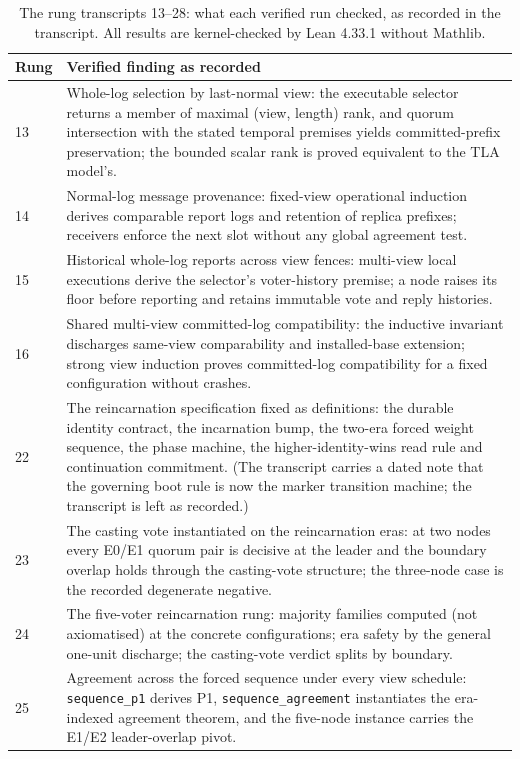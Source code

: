 \documentclass[10pt,journal,letterpaper]{IEEEtran}
\newcommand{\code}[1]{\texttt{#1}}
\begin{document}
\begin{table}[t]
\centering
\caption{The rung transcripts 13--28: what each verified run checked, as recorded in the transcript. All results are kernel-checked by Lean 4.33.1 without Mathlib.}
\label{tab:rungs}
\small
\begin{tabular}{lp{}}
\toprule
Rung & Verified finding as recorded\\
\midrule
13 & Whole-log selection by last-normal view: the executable selector returns a member of maximal (view, length) rank, and quorum intersection with the stated temporal premises yields committed-prefix preservation; the bounded scalar rank is proved equivalent to the TLA model's.\\
14 & Normal-log message provenance: fixed-view operational induction derives comparable report logs and retention of replica prefixes; receivers enforce the next slot without any global agreement test.\\
15 & Historical whole-log reports across view fences: multi-view local executions derive the selector's voter-history premise; a node raises its floor before reporting and retains immutable vote and reply histories.\\
16 & Shared multi-view committed-log compatibility: the inductive invariant discharges same-view comparability and installed-base extension; strong view induction proves committed-log compatibility for a fixed configuration without crashes.\\
22 & The reincarnation specification fixed as definitions: the durable identity contract, the incarnation bump, the two-era forced weight sequence, the phase machine, the higher-identity-wins read rule and continuation commitment. (The transcript carries a dated note that the governing boot rule is now the marker transition machine; the transcript is left as recorded.)\\
23 & The casting vote instantiated on the reincarnation eras: at two nodes every E0/E1 quorum pair is decisive at the leader and the boundary overlap holds through the casting-vote structure; the three-node case is the recorded degenerate negative.\\
24 & The five-voter reincarnation rung: majority families computed (not axiomatised) at the concrete configurations; era safety by the general one-unit discharge; the casting-vote verdict splits by boundary.\\
25 & Agreement across the forced sequence under every view schedule: \code{sequence\_p1} derives P1, \code{sequence\_agreement} instantiates the era-indexed agreement theorem, and the five-node instance carries the E1/E2 leader-overlap pivot.\\

\end{tabular}
\end{table}
\end{document}
